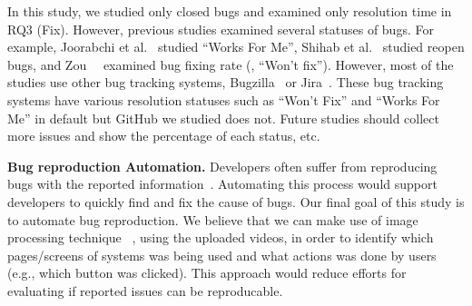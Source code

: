In this study, we studied only closed bugs and examined only resolution time in RQ3 (Fix). However, previous studies examined several statuses of bugs. For example, Joorabchi et al.~\citep{DBLP:conf/msr/JoorabchiMM14} studied ``Works For Me'', Shihab et al.~\citep{DBLP:journals/ese/ShihabIKIOAHM13} studied reopen bugs, and Zou~\et~\citep{DBLP:conf/compsac/ZouXZCL15} examined bug fixing rate (\eg, ``Won't fix''). 
However, most of the studies use other bug tracking systems, Bugzilla~\citep{Bugzilla} or Jira~\citep{JIRA}. 
These bug tracking systems have various resolution statuses such as ``Won't Fix'' and ``Works For Me''  in default but GitHub we studied does not. 
Future studies should collect more issues and show the percentage of each status, etc. 

\noindent
\textbf{Bug reproduction Automation.}
Developers often suffer from reproducing bugs with the reported information~\citep{DBLP:conf/sigsoft/ChaparroLZMPMBN17}\citep{DBLP:conf/icsm/0001KC20}\citep{zimmermann2010TSE}.
Automating this process would support developers to quickly find and fix the cause of bugs. 
Our final goal of this study is to automate bug reproduction. 
We believe that we can make use of image processing technique ~\citep{DBLP:conf/icse/Bernal-Cardenas20}\citep{he2019arxiv}\citep{DBLP:conf/nips/KrizhevskySH12}, using the uploaded videos, in order to identify which pages/screens of systems was being used and what actions was done by users (e.g., which button was clicked). 
This approach would reduce efforts for evaluating if reported issues can be reproducable. 





